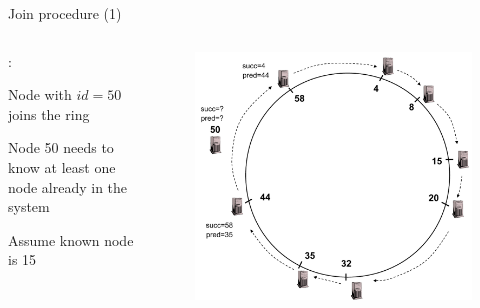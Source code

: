 \begin{frame}{Join procedure (1)}

\begin{columns}
\begin{column}{0.4\textwidth}
:
\BI
\item Node with $\mathit{id}=50$ joins the ring
\item Node 50 needs to know at least one node already in the system
\item Assume known node is 15		
\EI

\end{column}
\begin{column}{0.6\textwidth}
\begin{figure}
\includegraphics[width=1.0\textwidth]{chord-example3}
\end{figure}
\end{column}
\end{columns}

\end{frame}

